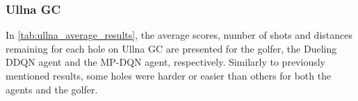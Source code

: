 \documentclass{kththesis}
\begin{document}
\begin{table}
    \centering
    \caption{The average directional deviations for each club used by the MP-DQN agent on Pebble Beach.}
    \label{tab:MPDQN_pebble_direction_choices}
\end{table}

\subsubsection{Ullna GC}
In \autoref{tab:ullna_average_results}, the average scores, number of shots and distances remaining for each hole on Ullna GC are presented for the golfer, the Dueling DDQN agent and the MP-DQN agent, respectively. Similarly to previously mentioned results, some holes were harder or easier than others for both the agents and the golfer. 
\end{document}
